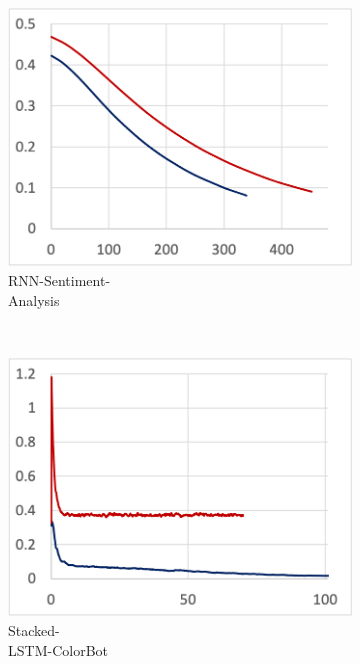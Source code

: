 \begin{figure}[!ht]
  \begin{subfigure}[t]{.22\textwidth}
    \includegraphics[width=\textwidth]{tf2-09}
    \caption{\footnotesize RNN-Sentiment-\\Analysis}
  \end{subfigure} 
  ~
  \begin{subfigure}[t]{.22\textwidth}
    \includegraphics[width=\textwidth]{tf2-10}
    \caption{\footnotesize Stacked-\\LSTM-ColorBot}
  \end{subfigure}
  ~
  \begin{subfigure}[t]{.22\textwidth}

\end{subfigure}
\end{figure}
